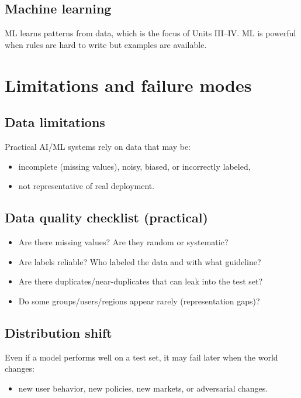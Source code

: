 \documentclass[11pt]{article}
\begin{document}
\subsection{Machine learning}
ML learns patterns from data, which is the focus of Units III--IV. ML is powerful when rules are hard to write but examples are available.

\section{Limitations and failure modes}
\subsection{Data limitations}
Practical AI/ML systems rely on data that may be:
\begin{itemize}[leftmargin=*]
  \item incomplete (missing values), noisy, biased, or incorrectly labeled,
  \item not representative of real deployment.
\end{itemize}

\subsection{Data quality checklist (practical)}
\begin{itemize}[leftmargin=*]
  \item Are there missing values? Are they random or systematic?
  \item Are labels reliable? Who labeled the data and with what guideline?
  \item Are there duplicates/near-duplicates that can leak into the test set?
  \item Do some groups/users/regions appear rarely (representation gaps)?
\end{itemize}

\subsection{Distribution shift}
Even if a model performs well on a test set, it may fail later when the world changes:
\begin{itemize}[leftmargin=*]
  \item new user behavior, new policies, new markets, or adversarial changes.
\end{itemize}
\end{document}
